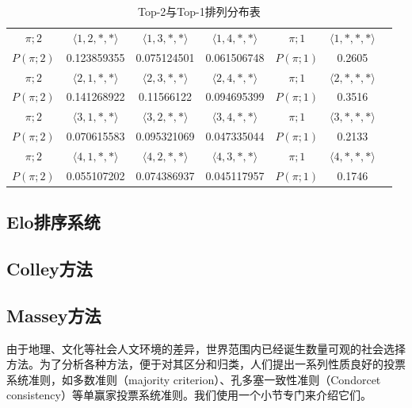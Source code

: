\begin{example}
\begin{table}[htbp]
    \centering
    \begin{tabular}{|c|c|c|c|c|c|c|}
      \hline
       $\pi; 2$ & $\langle 1,2,*,*\rangle$ & $\langle 1,3,*,*\rangle$ & $\langle 1,4,*,*\rangle$ & $\pi;1$ & $\langle 1,*,*,*\rangle$\\
       $P(\pi; 2)$ & 0.123859355 & 0.075124501 & 0.061506748 & $P(\pi; 1)$ & 0.2605\\
      \hline
       $\pi; 2$ & $\langle 2,1,*,*\rangle$ & $\langle 2,3,*,*\rangle$ & $\langle 2,4,*,*\rangle$ & $\pi;1$ & $\langle 2,*,*,*\rangle$\\
       $P(\pi; 2)$ & 0.141268922 & 0.11566122 & 0.094695399 & $P(\pi; 1)$ & 0.3516\\
      \hline
       $\pi; 2$ & $\langle 3,1,*,*\rangle$ & $\langle 3,2,*,*\rangle$ & $\langle 3,4,*,*\rangle$ & $\pi;1$ & $\langle 3,*,*,*\rangle$\\
       $P(\pi; 2)$ & 0.070615583 & 0.095321069 & 0.047335044 & $P(\pi; 1)$ & 0.2133\\
      \hline
       $\pi; 2$ & $\langle 4,1,*,*\rangle$ & $\langle 4,2,*,*\rangle$ & $\langle 4,3,*,*\rangle$ & $\pi;1$ & $\langle 4,*,*,*\rangle$\\
       $P(\pi; 2)$ & 0.055107202 & 0.074386937 & 0.045117957 & $P(\pi; 1)$ & 0.1746\\
      \hline
    \end{tabular}
    \caption{Top-2与Top-1排列分布表}
    \label{tbl:permuprob-top1-2}
\end{table}
\end{example}

\subsection{Elo排序系统}
\subsection{Colley方法}
\subsection{Massey方法}

由于地理、文化等社会人文环境的差异，世界范围内已经诞生数量可观的社会选择方法。为了分析各种方法，便于对其区分和归类，人们提出一系列性质良好的投票系统准则，如多数准则（majority criterion）、孔多塞一致性准则（Condorcet consistency）等单赢家投票系统准则。我们使用一个小节专门来介绍它们。

